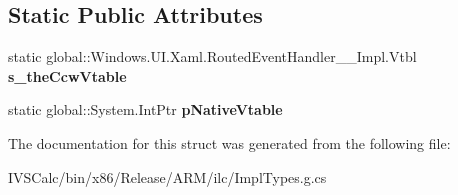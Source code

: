 \subsection*{Static Public Attributes}
\begin{DoxyCompactItemize}
\item 
\mbox{\label{struct_windows_1_1_u_i_1_1_xaml_1_1_routed_event_handler_____impl_1_1_vtbl_ad29518fb385d3e8705295f1567a8c002}} 
static global\+::\+Windows.\+U\+I.\+Xaml.\+Routed\+Event\+Handler\+\_\+\+\_\+\+Impl.\+Vtbl {\bfseries s\+\_\+the\+Ccw\+Vtable}
\item 
\mbox{\label{struct_windows_1_1_u_i_1_1_xaml_1_1_routed_event_handler_____impl_1_1_vtbl_ab54b1b81006517c4831ad3c0bfdf7d0f}} 
static global\+::\+System.\+Int\+Ptr {\bfseries p\+Native\+Vtable}
\end{DoxyCompactItemize}


The documentation for this struct was generated from the following file\+:\begin{DoxyCompactItemize}
\item 
I\+V\+S\+Calc/bin/x86/\+Release/\+A\+R\+M/ilc/Impl\+Types.\+g.\+cs\end{DoxyCompactItemize}
